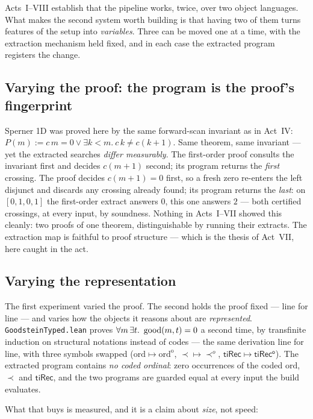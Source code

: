 Acts~I--VIII establish that the pipeline works, twice, over two object
languages. What makes the second system worth building is that having two of
them turns features of the setup into \emph{variables}. Three can be moved one
at a time, with the extraction mechanism held fixed, and in each case the
extracted program registers the change.

\subsection*{Varying the proof: the program is the proof's fingerprint}

Sperner 1D was proved here by the same forward-scan invariant as in Act~IV:
$P(m) := c\,m = 0 \lor \exists k{<}m.\ c\,k \neq c(k{+}1)$. Same theorem,
same invariant --- yet the extracted searches \emph{differ measurably}. The
first-order proof consults the invariant first and decides $c(m{+}1)$
second; its program returns the \emph{first} crossing. The \haomega{} proof
decides $c(m{+}1) = 0$ first, so a fresh zero re-enters the left disjunct
and discards any crossing already found; its program returns the
\emph{last}: on $[0,1,0,1]$ the first-order extract answers $0$, this one
answers $2$ --- both certified crossings, at every input, by soundness.
Nothing in Acts~I--VII showed this cleanly: two proofs of one theorem,
distinguishable by running their extracts. The extraction map is faithful
to proof structure --- which is the thesis of Act~VII, here caught in the
act.

\subsection*{Varying the representation}

The first experiment varied the proof. The second holds the proof fixed ---
line for line --- and varies how the objects it reasons about are
\emph{represented}. \texttt{GoodsteinTyped.lean} proves
$\forall m\,\exists t.\ \operatorname{good}(m,t)=0$ a second time, by transfinite induction
on structural notations instead of codes --- the same derivation line for
line, with three symbols swapped ($\mathrm{ord}\mapsto\mathrm{ord^o}$,
$\prec\mapsto\prec^o$, $\mathsf{tiRec}\mapsto\mathsf{tiRec^o}$). The
extracted program contains \emph{no coded ordinal}: zero occurrences of the
coded $\mathrm{ord}$, $\prec$ and $\mathsf{tiRec}$, and the two programs are
guarded equal at every input the build evaluates.

What that buys is measured, and it is a claim about \emph{size}, not speed:

